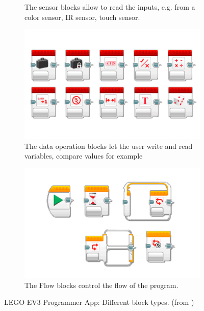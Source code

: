 \documentclass[runningheads,a4paper]{llncs}
\begin{document}
\begin{figure}[H]
\begin{subfigure}[t]{0.45\textwidth}
\caption{The sensor blocks allow to read the inputs, e.g. from a color sensor, IR sensor, touch sensor.} \label{fig:sensorblocks}\end{subfigure}
\begin{subfigure}[t]{0.45\textwidth}\centering\includegraphics[width=.9\columnwidth]{images/LearnToProgram_operations_blocks_landscape.png}
\caption{The data operation blocks let the user write and read variables, compare values for example }\label{fig:operationsblocks}\end{subfigure}\hspace*{\fill}
\begin{subfigure}[t]{0.45\textwidth}\centering\includegraphics[width=.9\columnwidth]{images/LearnToProgram_flow_blocks_landscape.png}
\caption{The Flow blocks control the flow of the program.}\label{fig:flowblocks}\end{subfigure}
\caption{LEGO EV3 Programmer App: Different block types. (from \cite{legoev3})}
\end{figure}
  
\end{document}
